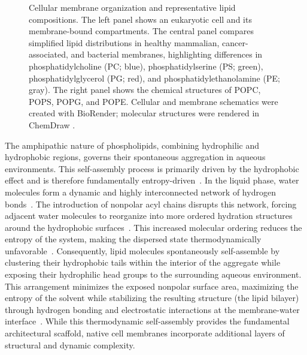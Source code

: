 \begin{figure}[h]
    \centering

    

    \caption[Cellular membrane organization and representative lipid compositions.]{Cellular membrane organization and representative lipid compositions. The left panel shows an eukaryotic cell and its membrane-bound compartments. The central panel compares simplified lipid distributions in healthy mammalian, cancer-associated, and bacterial membranes, highlighting differences in phosphatidylcholine (PC; blue), phosphatidylserine (PS; green), phosphatidylglycerol (PG; red), and phosphatidylethanolamine (PE; gray). The right panel shows the chemical structures of POPC, POPS, POPG, and POPE. Cellular and membrane schematics were created with BioRender\protect\footnotemark; molecular structures were rendered in ChemDraw \cite{chemdraw}.}

    \label{fig:Lipids}

\end{figure}

\FloatBarrier
The amphipathic nature of phospholipids, combining hydrophilic and hydrophobic regions, governs their spontaneous aggregation in aqueous environments. This self-assembly process is primarily driven by the hydrophobic effect and is therefore fundamentally entropy-driven~\cite{self-assembly}. In the liquid phase, water molecules form a dynamic and highly interconnected network of hydrogen bonds~\cite{hydrogen_network}. The introduction of nonpolar acyl chains disrupts this network, forcing adjacent water molecules to reorganize into more ordered hydration structures around the hydrophobic surfaces~\cite{hidrofobic_effect}. This increased molecular ordering reduces the entropy of the system, making the dispersed state thermodynamically unfavorable~\cite{ENTROPIA_1,ENTROPIA_2}. Consequently, lipid molecules spontaneously self-assemble by clustering their hydrophobic tails within the interior of the aggregate while exposing their hydrophilic head groups to the surrounding aqueous environment. This arrangement minimizes the exposed nonpolar surface area, maximizing the entropy of the solvent while stabilizing the resulting structure (the lipid bilayer) through hydrogen bonding and electrostatic interactions at the membrane-water interface~\cite{self-assembly}. While this thermodynamic self-assembly provides the fundamental architectural scaffold, native cell membranes incorporate additional layers of structural and dynamic complexity.

